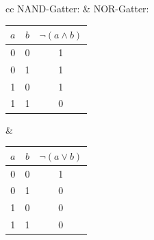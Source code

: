 \begin{Loesung}
\begin{tabular}{cc}
NAND-Gatter: & NOR-Gatter: \\
\begin{tabular}{|c|c||c}
\hline
$a$ & $b$ & $\neg(a \wedge b)$ \\
\hline \hline
0 & 0 & 1 \\
0 & 1 & 1 \\
1 & 0 & 1 \\
1 & 1 & 0 \\
\hline
\end{tabular}
&
\begin{tabular}{|c|c||c}
\hline
$a$ & $b$ & $\neg(a \vee b)$ \\
\hline \hline
0 & 0 & 1 \\
0 & 1 & 0 \\
1 & 0 & 0 \\
1 & 1 & 0 \\
\hline
\end{tabular}
\end{tabular}
\end{Loesung}